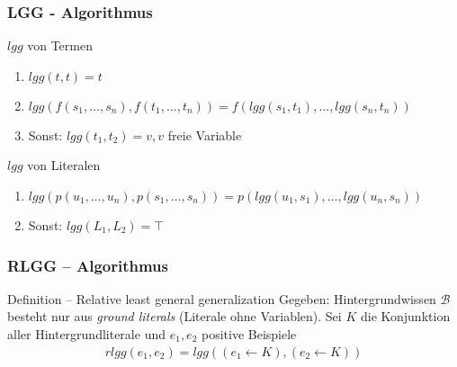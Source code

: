 \begin{frame}
\frametitle{LGG - Algorithmus}
	\begin{block}{$lgg$ von Termen}
		\begin{enumerate}
			\item $lgg(t,t) = t$\\
			\item $lgg(f(s_1, \ldots, s_n), f(t_1, \ldots, t_n)) = f(lgg(s_1, t_1), \ldots, lgg(s_n, t_n))$
			\item Sonst: $lgg(t_1, t_2) = v , v$ freie Variable
		\end{enumerate}
	\end{block}
	\begin{block}{$lgg$ von Literalen}
	\begin{enumerate}
		\item $lgg(p(u_1, \ldots, u_n), p(s_1, \ldots, s_n)) = p(lgg(u_1, s_1), \ldots, lgg(u_n, s_n))$\\
		\item Sonst: $lgg(L_1, L_2) = \top$
	\end{enumerate}
	\end{block}
\end{frame}


\begin{frame}
\frametitle{RLGG -- Algorithmus}
\begin{block}{Definition -- Relative least general generalization}
	Gegeben: Hintergrundwissen $\mathcal{B}$ besteht nur aus \emph{ground literals} (Literale ohne Variablen).
	Sei $K$ die Konjunktion aller Hintergrundliterale und $e_1, e_2$ positive Beispiele
	\begin{align*}
		rlgg(e_1, e_2) = lgg((e_1 \leftarrow K), (e_2 \leftarrow K))
	\end{align*}
\end{block}

\end{frame}


